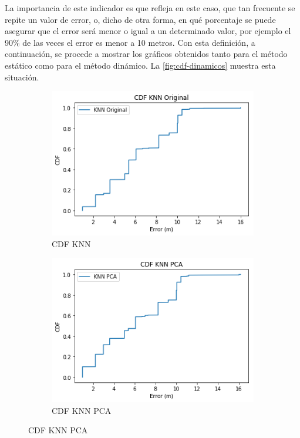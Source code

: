 La importancia de este indicador es que refleja en este caso, que tan frecuente se repite un valor de error, o, dicho de otra forma, en qué porcentaje se puede asegurar que el error será menor o igual a un determinado valor, por ejemplo el 90\% de las veces el error es menor a 10 metros. Con esta definición, a continuación, se procede a mostrar los gráficos obtenidos tanto para el método estático como para el método dinámico. La \autoref{fig:cdf-dinamicos} muestra esta situación.

\newpage

\begin{figure}[ht!]
\centering
\begin{subfigure}{.5\textwidth}
  \centering
  \includegraphics[width=.8\linewidth]{figures/cdf-knn-dinamico.png}
  \caption{CDF KNN}
  \label{fig:sub1}
\end{subfigure}%
\begin{subfigure}{.5\textwidth}
  \centering
  \includegraphics[width=.8\linewidth]{figures/cdf-knnPCA-dinamico.png}
  \caption{CDF KNN PCA}
  \label{fig:sub2}
\end{subfigure}


\end{figure}
